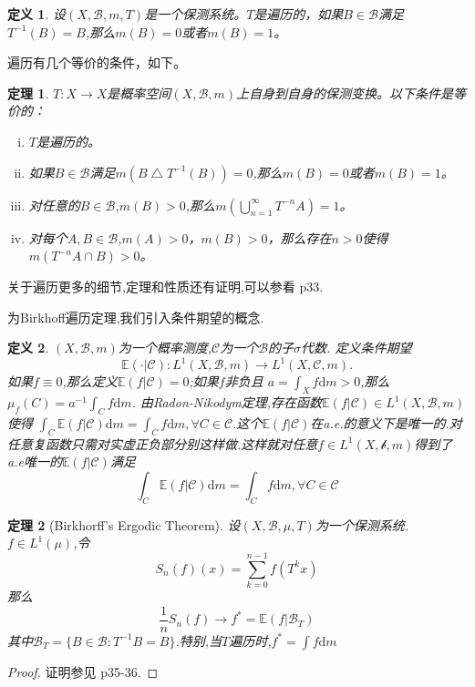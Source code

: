 \documentclass[a4paper,11pt,oneside]{book}
\newtheorem{theorem}{\textbf{\hspace{0.7cm}定理}}[section]
\newtheorem{definition}{\textbf{\hspace{0.7cm}定义}}[section]
\newcommand{\ms}[1]{\mathscr{#1}}
\begin{document}
\begin{definition}
设$(X,\ms{B},m,T)$是一个保测系统。$T$是遍历的，如果$B\in\ms B $满足$T^{-1}(B)=B$,那么$m(B)=0$或者$m(B)=1$。
\end{definition}

遍历有几个等价的条件，如下。
\begin{theorem}
$T:X \rightarrow X$是概率空间$(X,\ms{B},m)$上自身到自身的保测变换。以下条件是等价的：
\begin{enumerate}[(i)]
\item $T$是遍历的。
\item 如果$B\in\ms B$满足$m(B\bigtriangleup T^{-1}(B))=0$,那么$m(B)=0$或者$m(B)=1$。
\item 对任意的$B\in\ms B$,$m(B)>0$,那么$m(\bigcup_{n=1}^{\infty}T^{-n}A)=1$。
\item 对每个$A,B\in\ms B$,$m(A)>0$，$m(B)>0$，那么存在$n>0$使得$m(T^{-n}A\cap B)>0$。
\end{enumerate}
\end{theorem}

关于遍历更多的细节,定理和性质还有证明,可以参看\cite{pw} p33.

为Birkhoff遍历定理,我们引入条件期望的概念.
\begin{definition}
$(X,\ms{B},m)$为一个概率测度,$\ms C$为一个$\ms B$的子$\sigma$代数.
定义条件期望$$\mathbb{E}(\cdot|\ms{C}):L^1(X,\ms{B},m)\rightarrow L^1(X,\ms{C},m).$$如果$f\equiv 0$,那么定义$\mathbb{E}(f|\ms{C})=0$;如果$f$非负且%
$a=\int_X f \mathrm d m>0$,那么$\mu_f(C)=a^{-1}\int_C f\mathrm d m$.
由Radon-Nikodym定理,存在函数$\mathbb{E}(f|\ms{C})\in L^1(X,\ms B,m)$使得%
$\int_C \mathbb{E}(f|\ms{C})\mathrm d m=\int_C f\mathrm d m,\forall C\in \ms C$.这个$\mathbb{E}(f|\ms{C})$在a.e.的意义下是唯一的.对任意复函数只需对实虚正负部分别这样做.这样就对任意$f\in L^1(X,\ms b,m)$得到了a.e唯一的$\mathbb{E}(f|\ms{C})$满足$$\int_C \mathbb{E}(f|\ms{C})\mathrm d m=\int_C f\mathrm d m,\forall C\in \ms C$$
\end{definition}

\begin{theorem}[Birkhorff's Ergodic Theorem]
设$(X,\ms B,\mu,T)$为一个保测系统.$f\in L^1(\mu)$,令$$S_n(f)(x)=\sum_{k=0}^{n-1}f(T^kx)$$那么$$\frac{1}{n}S_n(f)\rightarrow f^*=\mathbb{E}(f|\ms B_T)$$
其中$\ms B_T=\{B\in \ms B:T^{-1}B=B\}$.特别,当$T$遍历时,$f^*=\int f \mathrm d m$
\end{theorem}
\begin{proof}
证明参见\cite{hy} p35-36.
\end{proof}
\end{document}
